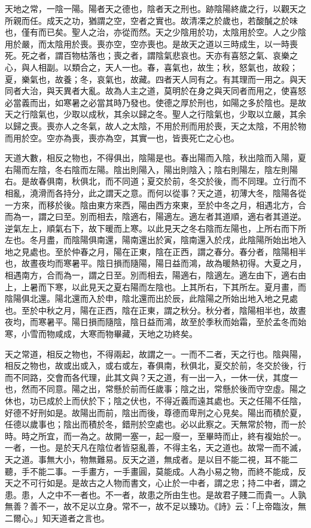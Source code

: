 
天地之常，一陰一陽。陽者天之德也，陰者天之刑也。跡陰陽終歲之行，以觀天之所親而任。成天之功，猶謂之空，空者之實也。故清凓之於歲也，若酸醎之於味也，僅有而已矣。聖人之治，亦從而然。天之少陰用於功，太陰用於空。人之少陰用於嚴，而太陰用於喪。喪亦空，空亦喪也。是故天之道以三時成生，以一時喪死。死之者，謂百物枯落也；喪之者，謂陰氣悲哀也。天亦有喜怒之氣、哀樂之心，與人相副。以類合之，天人一也。春，喜氣也，故生；秋，怒氣也，故殺；夏，樂氣也，故養；冬，哀氣也，故藏。四者天人同有之。有其理而一用之。與天同者大治，與天異者大亂。故為人主之道，莫明於在身之與天同者而用之，使喜怒必當義而出，如寒暑之必當其時乃發也。使德之厚於刑也，如陽之多於陰也。是故天之行陰氣也，少取以成秋，其余以歸之冬。聖人之行陰氣也，少取以立嚴，其余以歸之喪。喪亦人之冬氣，故人之太陰，不用於刑而用於喪，天之太陰，不用於物而用於空。空亦為喪，喪亦為空，其實一也，皆喪死亡之心也。

天道大數，相反之物也，不得俱出，陰陽是也。春出陽而入陰，秋出陰而入陽，夏右陽而左陰，冬右陰而左陽。陰出則陽入，陽出則陰入；陰右則陽左，陰左則陽右。是故春俱南，秋俱北，而不同道；夏交於前，冬交於後，而不同理。立行而不相亂，澆滑而各持分，此之謂天之意。而何以從事？天之道，初薄大冬，陰陽各從一方來，而移於後。陰由東方來西，陽由西方來東，至於中冬之月，相遇北方，合而為一，謂之曰至。別而相去，陰適右，陽適左。適左者其道順，適右者其道逆。逆氣左上，順氣右下，故下暖而上寒。以此見天之冬右陰而左陽也，上所右而下所左也。冬月盡，而陰陽俱南還，陽南還出於寅，陰南還入於戌，此陰陽所始出地入地之見處也。至於仲春之月，陽在正東，陰在正西，謂之春分。春分者，陰陽相半也，故晝夜均而寒暑平。陰日損而隨陽，陽日益而鴻，故為暖熱初得。大夏之月，相遇南方，合而為一，謂之日至。別而相去，陽適右，陰適左。適左由下，適右由上，上暑而下寒，以此見天之夏右陽而左陰也。上其所右，下其所左。夏月畫，而陰陽俱北還。陽北還而入於申，陰北還而出於辰，此陰陽之所始出地入地之見處也。至於中秋之月，陽在正西，陰在正東，謂之秋分。秋分者，陰陽相半也，故晝夜均，而寒暑平。陽日損而隨陰，陰日益而鴻，故至於季秋而始霜，至於孟冬而始寒，小雪而物咸成，大寒而物畢藏，天地之功終矣。


天之常道，相反之物也，不得兩起，故謂之一。一而不二者，天之行也。陰與陽，相反之物也，故或出或入，或右或左，春俱南，秋俱北，夏交於前，冬交於後，行而不同路，交會而各代理，此其文與？天之道，有一出一入，一休一伏，其度一也，然而不同意。陽之出，常懸於前而任歲事；陰之出，常懸於後而守空虛。陽之休也，功已成於上而伏於下；陰之伏也，不得近義而遠其處也。天之任陽不任陰，好德不好刑如是。故陽出而前，陰出而後，尊德而卑刑之心見矣。陽出而積於夏，任德以歲事也；陰出而積於冬，錯刑於空處也。必以此察之。天無常於物，而一於時。時之所宜，而一為之。故開一塞一，起一廢一，至畢時而止，終有複始於一。一者，一也。是於天凡在陰位者皆惡亂善，不得主名，天之道也。故常一而不滅，天之道。事無大小，物無難易。反天之道，無成者。是以目不能二視，耳不能二聽，手不能二事。一手畫方，一手畫圓，莫能成。人為小易之物，而終不能成，反天之不可行如是。是故古之人物而書文，心止於一中者，謂之忠；持二中者，謂之患。患，人之中不一者也。不一者，故患之所由生也。是故君子賤二而貴一。人孰無善？善不一，故不足以立身。常不一，故不足以臻功。《詩》云：「上帝臨汝，無二爾心。」知天道者之言也。

